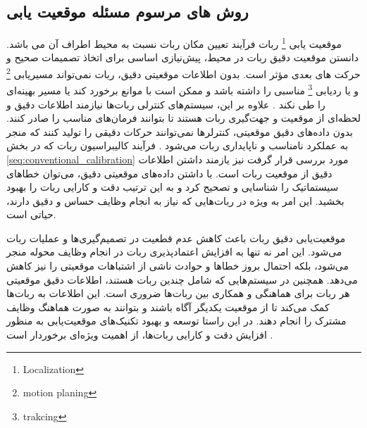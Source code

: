 \subsection{روش های مرسوم مسئله موقعیت یابی}
موقعیت یابی
\footnote{Localization}
 ربات فرآیند تعیین مکان ربات نسبت به محیط اطراف آن می باشد. دانستن موقعیت دقیق ربات در محیط، پیش‌نیازی اساسی برای اتخاذ تصمیمات صحیح و حرکت های بعدی مؤثر است. بدون اطلاعات موقعیتی دقیق، ربات نمی‌تواند مسیریابی
\footnote{motion planing}
  و یا ردیابی
\footnote{trakcing}
مناسبی را داشته باشد و ممکن است با موانع برخورد کند یا مسیر بهینه‌ای را طی نکند
\cite{ahmad2013cooperative}.
 علاوه بر این، سیستم‌های کنترلی ربات‌ها نیازمند اطلاعات دقیق و لحظه‌ای از موقعیت و جهت‌گیری ربات هستند تا بتوانند فرمان‌های مناسب را صادر کنند. بدون داده‌های دقیق موقعیتی، کنترلرها نمی‌توانند حرکات دقیقی را تولید کنند که منجر به عملکرد نامناسب و ناپایداری ربات می‌شود
\cite{guibas1997robot}.
فرآیند کالیبراسیون ربات که در بخش 
\ref{seq:conventional_calibration}
مورد بررسی قرار گرفت نیز یازمند داشتن اطلاعات دقیق از موقعیت ربات است. با داشتن داده‌های موقعیتی دقیق، می‌توان خطاهای سیستماتیک را شناسایی و تصحیح کرد و به این ترتیب دقت و کارایی ربات را بهبود بخشید. این امر به ویژه در ربات‌هایی که نیاز به انجام وظایف حساس و دقیق دارند، حیاتی است. 

موقعیت‌یابی دقیق ربات باعث کاهش عدم قطعیت در تصمیم‌گیری‌ها و عملیات ربات می‌شود. این امر نه تنها به افزایش اعتمادپذیری ربات در انجام وظایف محوله منجر می‌شود، بلکه احتمال بروز خطاها و حوادث ناشی از اشتباهات موقعیتی را نیز کاهش می‌دهد. همچنین در سیستم‌هایی که شامل چندین ربات هستند، اطلاعات دقیق موقعیتی هر ربات برای هماهنگی و همکاری بین ربات‌ها ضروری است. این اطلاعات به ربات‌ها کمک می‌کند تا از موقعیت یکدیگر آگاه باشند و بتوانند به صورت هماهنگ وظایف مشترک را انجام دهند. در این راستا توسعه و بهبود تکنیک‌های موقعیت‌یابی به منظور افزایش دقت و کارایی ربات‌ها، از اهمیت ویژه‌ای برخوردار است
\cite{aragues2011multi}.



